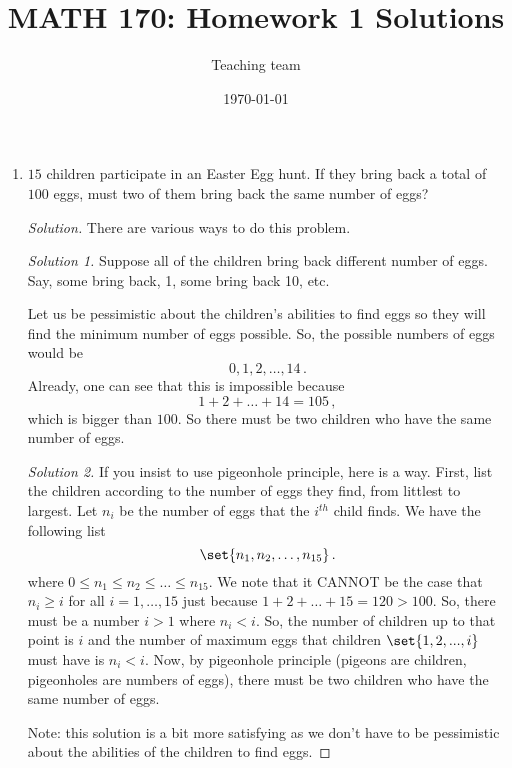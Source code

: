 \documentclass[12pt]{amsart}
\title{ MATH 170: Homework 1 Solutions }
\author{Teaching team}
\date{\today}
\begin{document}
\maketitle

\begin{enumerate}[label=\arabic*.,itemsep=10pt, leftmargin=*]
    \item  $15$ children participate in an Easter Egg hunt. If they bring back a total of $100$ eggs, must two of them bring back the same number of eggs?

\begin{proof}[Solution]
   There are various ways to do this problem. 
   
   \emph{Solution 1.}
   Suppose all of the children bring back different
   number of eggs.
   Say, some bring back, 1, some bring back 10, etc.

   Let us be pessimistic about the children's abilities to find eggs so they will
   find the minimum number of eggs possible.
   So, the possible numbers of eggs would be
   \begin{equation*}
       0, 1, 2, \dots, 14\,.
   \end{equation*}
   Already, one can see that this is impossible because
   \begin{equation*}
       1+2+\dots+14 = 105\,,
   \end{equation*}
   which is bigger than $100$.
   So there must be two children who have the same number of eggs.

   \emph{Solution 2.} If you insist to use pigeonhole principle, here is a way.
   First, list the children according to the number of eggs they find, from 
   littlest to largest.
   Let $n_i$ be the number of eggs that the $i^{th}$ child finds.
   We have the following list
   \begin{equation*}
       \set {n_1, n_2, \dots, n_{15} } \,.
   \end{equation*}
   where $0 \leq n_1 \leq n_2 \leq \dots \leq n_{15}$.
   We note that it CANNOT be the case that $n_i \geq i$ for all $i=1, \dots, 15$
   just because $1+2+\dots+ 15 = 120 > 100$.
   So, there must be a number $i > 1$ where $n_i < i$.
   So, the number of children up to that point is $i$ and the number of maximum eggs
   that children $\set{1,2,...,i}$ must have is $n_i < i$.
   Now, by pigeonhole principle (pigeons are children, pigeonholes are numbers of eggs),
   there must be two children who have the same number of eggs.

   Note: this solution is a bit more satisfying as we don't have to be pessimistic about
   the abilities of the children to find eggs.
\end{proof}
    

\end{enumerate}
\end{document}
